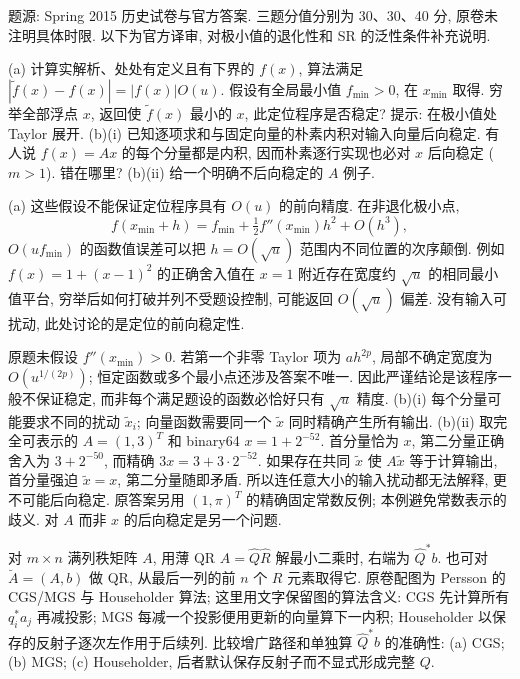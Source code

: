 题源: Spring 2015 历史试卷与官方答案. 三题分值分别为 30、30、40 分, 原卷未注明具体时限. 以下为官方译审, 对极小值的退化性和 SR 的泛性条件补充说明.
\begin{exercise}\label{e2015:q1}
(a) 计算实解析、处处有定义且有下界的 $f(x)$, 算法满足 $|\widetilde f(x)-f(x)|=|f(x)|O(u)$. 假设有全局最小值 $f_{\min}>0$, 在 $x_{\min}$ 取得. 穷举全部浮点 $x$, 返回使 $\widetilde f(x)$ 最小的 $x$, 此定位程序是否稳定? 提示: 在极小值处 Taylor 展开.
(b)(i) 已知逐项求和与固定向量的朴素内积对输入向量后向稳定. 有人说 $f(x)=Ax$ 的每个分量都是内积, 因而朴素逐行实现也必对 $x$ 后向稳定 ($m>1$). 错在哪里?
(b)(ii) 给一个明确不后向稳定的 $A$ 例子.
\end{exercise}
\begin{solution}
(a) 这些假设不能保证定位程序具有 $O(u)$ 的前向精度. 在非退化极小点,
\[
 f(x_{\min}+h)=f_{\min}+\tfrac12 f''(x_{\min})h^2+O(h^3),
\]
$O(uf_{\min})$ 的函数值误差可以把 $h=O(\sqrt u)$ 范围内不同位置的次序颠倒. 例如 $f(x)=1+(x-1)^2$ 的正确舍入值在 $x=1$ 附近存在宽度约 $\sqrt u$ 的相同最小值平台, 穷举后如何打破并列不受题设控制, 可能返回 $O(\sqrt u)$ 偏差. 没有输入可扰动, 此处讨论的是定位的前向稳定性.

原题未假设 $f''(x_{\min})>0$. 若第一个非零 Taylor 项为 $a h^{2p}$, 局部不确定宽度为 $O(u^{1/(2p)})$; 恒定函数或多个最小点还涉及答案不唯一. 因此严谨结论是该程序一般不保证稳定, 而非每个满足题设的函数必恰好只有 $\sqrt u$ 精度.
(b)(i) 每个分量可能要求不同的扰动 $\widetilde x_i$; 向量函数需要同一个 $\widetilde x$ 同时精确产生所有输出.
(b)(ii) 取完全可表示的 $A=(1,3)^T$ 和 binary64 $x=1+2^{-52}$. 首分量恰为 $x$, 第二分量正确舍入为 $3+2^{-50}$, 而精确 $3x=3+3\cdot2^{-52}$. 如果存在共同 $\widetilde x$ 使 $A\widetilde x$ 等于计算输出, 首分量强迫 $\widetilde x=x$, 第二分量随即矛盾. 所以连任意大小的输入扰动都无法解释, 更不可能后向稳定. 原答案另用 $(1,\pi)^T$ 的精确固定常数反例; 本例避免常数表示的歧义. 对 $A$ 而非 $x$ 的后向稳定是另一个问题.
\end{solution}
\begin{exercise}\label{e2015:q2}
对 $m\times n$ 满列秩矩阵 $A$, 用薄 QR $A=\widehat Q\widehat R$ 解最小二乘时, 右端为 $\widehat Q^*b$. 也可对 $\breve A=(A,b)$ 做 QR, 从最后一列的前 $n$ 个 $R$ 元素取得它. 原卷配图为 Persson 的 CGS/MGS 与 Householder 算法; 这里用文字保留图的算法含义: CGS 先计算所有 $q_i^*a_j$ 再减投影; MGS 每减一个投影便用更新的向量算下一内积; Householder 以保存的反射子逐次左作用于后续列. 比较增广路径和单独算 $\widehat Q^*b$ 的准确性:
(a) CGS; (b) MGS; (c) Householder, 后者默认保存反射子而不显式形成完整 $Q$.
\end{exercise}
